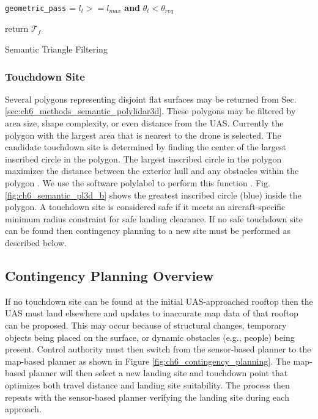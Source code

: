 \begin{algorithm}[ht]
{        
        \texttt{geometric\_pass} = $l_t>= l_{max}$ {\bf and} $\theta_t < \theta_{req}$  \\
        

    }
    return $\mathcal{T}_f$
    \caption[Semantic Triangle Filtering]{Semantic Triangle Filtering}
    \label{alg:triangle_filtering}
\end{algorithm}

\subsubsection{Touchdown Site}

Several polygons representing disjoint flat surfaces may be returned from Sec. \ref{sec:ch6_methods_semantic_polylidar3d}. These polygons may be filtered by area size, shape complexity, or even distance from the UAS. Currently the polygon with the largest area that is nearest to the drone is selected. The candidate touchdown site is determined by finding the center of the largest inscribed circle in the polygon. The largest inscribed circle in the polygon maximizes the distance between the exterior hull and any obstacles within the polygon \cite{castagno_map-based_2021, garcia-castellanos_poles_2007}. We use the software polylabel to perform this function \cite{noauthor_github_2018-3}. Fig. \ref{fig:ch6_semantic_pl3d_b} shows the greatest inscribed circle (blue) inside the polygon. A touchdown site is considered safe if it meets an aircraft-specific minimum radius constraint for safe landing clearance. If no safe touchdown site can be found then contingency planning to a new site must be performed as described below.

\subsection{Contingency Planning Overview}\label{sec:ch6_methods_contingency_planning}

If no touchdown site can be found at the initial UAS-approached rooftop then the UAS must land elsewhere and updates to inaccurate map data of that rooftop can be proposed. This may occur because of structural changes, temporary objects being placed on the surface, or dynamic obstacles (e.g., people) being present. Control authority must then switch from the sensor-based planner to the map-based planner as shown in Figure \ref{fig:ch6_contingency_planning}. The map-based planner will then select a new landing site and touchdown point that optimizes both travel distance and landing site suitability. The process then repeats with the sensor-based planner verifying the landing site during each approach.

